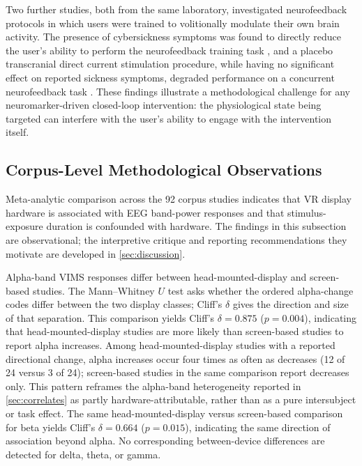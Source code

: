 Two further studies, both from the same laboratory, investigated neurofeedback protocols in which users were trained to volitionally modulate their own brain activity.
The presence of cybersickness symptoms was found to directly reduce the user's ability to perform the neurofeedback training task \cite{bergerManipulatingCybersicknessVirtual2025}, and a placebo transcranial direct current stimulation procedure, while having no significant effect on reported sickness symptoms, degraded performance on a concurrent neurofeedback task \cite{bergerInfluencePlaceboTDCS2024}.
These findings illustrate a methodological challenge for any neuromarker-driven closed-loop intervention: the physiological state being targeted can interfere with the user's ability to engage with the intervention itself.


\subsection{Corpus-Level Methodological Observations}\label{sec:confounders}

Meta-analytic comparison across the 92 corpus studies indicates that VR display hardware is associated with EEG band-power responses and that stimulus-exposure duration is confounded with hardware.
The findings in this subsection are observational; the interpretive critique and reporting recommendations they motivate are developed in \autoref{sec:discussion}.

Alpha-band VIMS responses differ between head-mounted-display and screen-based studies.
The Mann--Whitney $U$ test asks whether the ordered alpha-change codes differ between the two display classes; Cliff's $\delta$ gives the direction and size of that separation.
This comparison yields Cliff's $\delta = 0.875$ ($p = 0.004$), indicating that head-mounted-display studies are more likely than screen-based studies to report alpha increases.
Among head-mounted-display studies with a reported directional change, alpha increases occur four times as often as decreases (12 of 24 versus 3 of 24); screen-based studies in the same comparison report decreases only.
This pattern reframes the alpha-band heterogeneity reported in \autoref{sec:correlates} as partly hardware-attributable, rather than as a pure intersubject or task effect.
The same head-mounted-display versus screen-based comparison for beta yields Cliff's $\delta = 0.664$ ($p = 0.015$), indicating the same direction of association beyond alpha.
No corresponding between-device differences are detected for delta, theta, or gamma.

